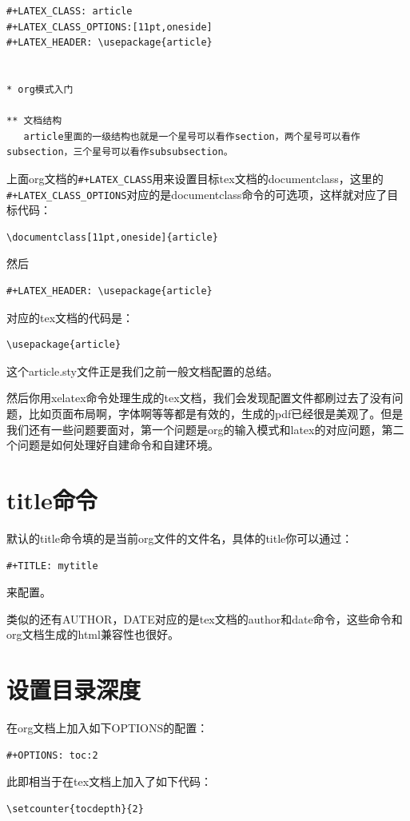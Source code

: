 \documentclass[11pt,oneside]{book}
\begin{document}
\begin{Verbatim}
#+LATEX_CLASS: article
#+LATEX_CLASS_OPTIONS:[11pt,oneside]
#+LATEX_HEADER: \usepackage{article}


* org模式入门
  
** 文档结构
   article里面的一级结构也就是一个星号可以看作section，两个星号可以看作subsection，三个星号可以看作subsubsection。
\end{Verbatim}

上面org文档的\verb|#+LATEX_CLASS|用来设置目标tex文档的documentclass，这里的\verb|#+LATEX_CLASS_OPTIONS|对应的是documentclass命令的可选项，这样就对应了目标代码：
\begin{Verbatim}
\documentclass[11pt,oneside]{article}
\end{Verbatim}

然后
\begin{Verbatim}
#+LATEX_HEADER: \usepackage{article}
\end{Verbatim}
对应的tex文档的代码是：
\begin{Verbatim}
\usepackage{article}
\end{Verbatim}
这个article.sty文件正是我们之前一般文档配置的总结。

然后你用xelatex命令处理生成的tex文档，我们会发现配置文件都刷过去了没有问题，比如页面布局啊，字体啊等等都是有效的，生成的pdf已经很是美观了。但是我们还有一些问题要面对，第一个问题是org的输入模式和latex的对应问题，第二个问题是如何处理好自建命令和自建环境。

\section{title命令}
默认的title命令填的是当前org文件的文件名，具体的title你可以通过：
\begin{Verbatim}
#+TITLE: mytitle
\end{Verbatim}
来配置。

类似的还有AUTHOR，DATE对应的是tex文档的author和date命令，这些命令和org文档生成的html兼容性也很好。

\section{设置目录深度}
在org文档上加入如下OPTIONS的配置：
\begin{Verbatim}
#+OPTIONS: toc:2
\end{Verbatim}
此即相当于在tex文档上加入了如下代码：
\begin{Verbatim}
\setcounter{tocdepth}{2}
\end{Verbatim}
\end{document}
